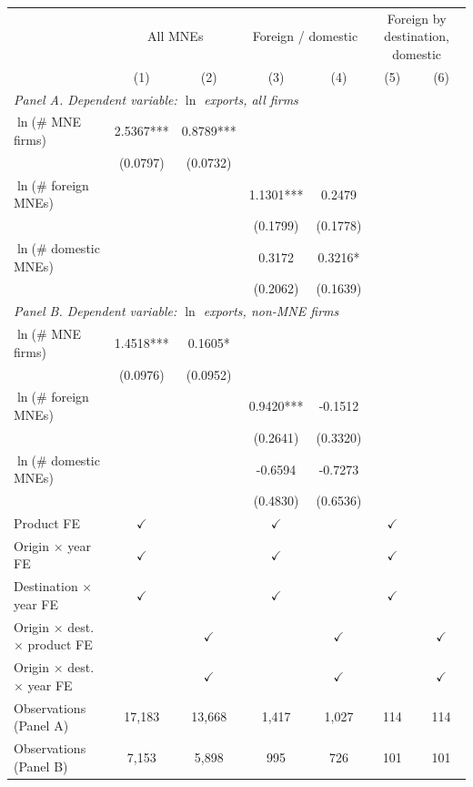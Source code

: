 \begin{tabular}{lcccccc} \hline
 & \multicolumn{2}{c}{All MNEs} & \multicolumn{2}{c}{Foreign / domestic} & \multicolumn{2}{c}{Foreign by destination, domestic} \\
 & (1) & (2) & (3) & (4) & (5) & (6) \\ \hline
\multicolumn{7}{l}{\textit{Panel A. Dependent variable: $\ln$ exports, all firms}} \\
$\ln$(\# MNE firms) & 2.5367*** & 0.8789*** &  &  &  &  \\
 & (0.0797) & (0.0732) &  &  &  &  \\
$\ln$(\# foreign MNEs) &  &  & 1.1301*** & 0.2479 &  &  \\
 &  &  & (0.1799) & (0.1778) &  &  \\
$\ln$(\# domestic MNEs) &  &  & 0.3172 & 0.3216* &  &  \\
 &  &  & (0.2062) & (0.1639) &  &  \\
\midrule
\multicolumn{7}{l}{\textit{Panel B. Dependent variable: $\ln$ exports, non-MNE firms}} \\
$\ln$(\# MNE firms) & 1.4518*** & 0.1605* &  &  &  &  \\
 & (0.0976) & (0.0952) &  &  &  &  \\
$\ln$(\# foreign MNEs) &  &  & 0.9420*** & -0.1512 &  &  \\
 &  &  & (0.2641) & (0.3320) &  &  \\
$\ln$(\# domestic MNEs) &  &  & -0.6594 & -0.7273 &  &  \\
 &  &  & (0.4830) & (0.6536) &  &  \\
\hline
Product FE & $\checkmark$ &  & $\checkmark$ &  & $\checkmark$ &  \\
Origin $\times$ year FE & $\checkmark$ &  & $\checkmark$ &  & $\checkmark$ &  \\
Destination $\times$ year FE & $\checkmark$ &  & $\checkmark$ &  & $\checkmark$ &  \\
Origin $\times$ dest.\ $\times$ product FE &  & $\checkmark$ &  & $\checkmark$ &  & $\checkmark$ \\
Origin $\times$ dest.\ $\times$ year FE &  & $\checkmark$ &  & $\checkmark$ &  & $\checkmark$ \\
Observations (Panel A) & 17,183 & 13,668 & 1,417 & 1,027 & 114 & 114 \\
Observations (Panel B) & 7,153 & 5,898 & 995 & 726 & 101 & 101 \\
\hline
\end{tabular}
